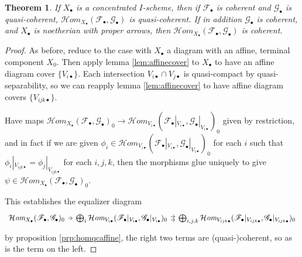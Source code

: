 \documentclass[proquest]{uwthesis}[2014/11/13]
\newtheorem{theorem}{Theorem}[section]
\theoremstyle{definition}
\newcommand{\cHom}{\mathcal{H} \textit{om}}
\newcommand{\FF}{\mathscr{F}}
\newcommand{\GG}{\mathscr{G}}
\begin{document}
\begin{theorem}
	If $X_\bullet$ is a concentrated $I$-scheme, then if $\FF_\bullet$ is coherent and $\GG_\bullet$ is quasi-coherent, $\cHom_{X_\bullet}(\FF_\bullet, \GG_\bullet)$ is quasi-coherent.
	If in addition $\GG_\bullet$ is coherent, and $X_\bullet$ is noetherian with proper arrows, then $\cHom_{X_\bullet}(\FF_\bullet, \GG_\bullet)$ is coherent.
\end{theorem}
\begin{proof}
	As before, reduce to the case with $X_\bullet$ a diagram with an affine, terminal component $X_0$.
	Then apply lemma \ref{lem:affinecover} to $X_\bullet$ to have an affine diagram cover $\{V_{i\bullet}\}$.
	Each intersection $V_{i \bullet} \cap V_{j \bullet}$ is quasi-compact by quasi-separability, so we can reapply lemma \ref{lem:affinecover} to have affine diagram covers $\{V_{ijk\bullet}\}$.
	
	Have maps $\cHom_{X_\bullet}(\FF_\bullet, \GG_\bullet)_0 \rightarrow \cHom_{V_{i\bullet}}(\FF_\bullet |_{V_{i\bullet}}, \GG_\bullet |_{V_{i \bullet}})_0$ given by restriction, and in fact if we are given $\phi_i \in \cHom_{V_{i\bullet}}(\FF_\bullet |_{V_{i\bullet}}, \GG_\bullet |_{V_{i \bullet}})_0$ for each $i$ such that $\phi_i |_{V_{ijk \bullet}} = \phi_j |_{V_{ijk \bullet}}$ for each $i, j, k$, then the morphisms glue uniquely to give $\psi \in \cHom_{X_\bullet}(\FF_\bullet, \GG_\bullet)_0$.
	
	This establishes the equalizer diagram
	\[
	\begin{tikzcd}[column sep=tiny]
		\cHom_{X_\bullet}(\FF_\bullet, \GG_\bullet)_0 \arrow{r} & \bigoplus_i \cHom_{V_{i\bullet}}(\FF_\bullet |_{V_{i\bullet}}, \GG_\bullet |_{V_{i \bullet}})_0 \arrow[yshift=.5ex]{r} \arrow[yshift=-.5ex]{r} & \bigoplus_{i,j,k} \cHom_{V_{ijk\bullet}}(\FF_\bullet |_{V_{ijk\bullet}}, \GG_\bullet |_{V_{ijk \bullet}})_0
	\end{tikzcd}
	\]
	by proposition \ref{prp:homqcaffine}, the right two terms are (quasi-)coherent, so as is the term on the left.
\end{proof}
\end{document}
